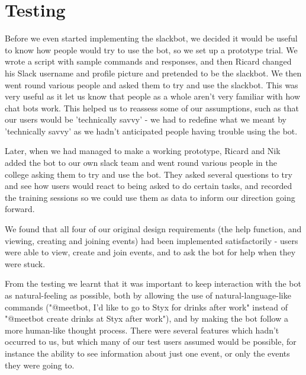 \documentclass[12pt]{report}
\begin{document}
\chapter{Testing}\label{testing}
Before we even started implementing the slackbot, we decided it would be useful to know how people would try to use the bot, so we set up a prototype trial. We wrote a script with sample commands and responses, and then Ricard changed his Slack username and profile picture and pretended to be the slackbot. We then went round various people and asked them to try and use the slackbot. This was very useful as it let us know that people as a whole aren't very familiar with how chat bots work. This helped us to reassess some of our assumptions, such as that our users would be 'technically savvy' - we had to redefine what we meant by 'technically savvy' as we hadn't anticipated people having trouble using the bot.

\vspace{3mm}

Later, when we had managed to make a working prototype, Ricard and Nik added the bot to our own slack team and went round various people in the college asking them to try and use the bot. They asked several questions to try and see how users would react to being asked to do certain tasks, and recorded the training sessions so we could use them as data to inform our direction going forward.

\vspace{3mm}

We found that all four of our original design requirements (the help function, and viewing, creating and joining events) had been implemented satisfactorily - users were able to view, create and join events, and to ask the bot for help when they were stuck.

\vspace{3mm}

From the testing we learnt that it was important to keep interaction with the bot as natural-feeling as possible, both by allowing the use of natural-language-like commands ("@meetbot, I'd like to go to Styx for drinks after work" instead of "@meetbot create drinks at Styx after work"), and by making the bot follow a more human-like thought process. There were several features which hadn't occurred to us, but which many of our test users assumed would be possible, for instance the ability to see information about just one event, or only the events they were going to.

\vspace{3mm}
\end{document}
